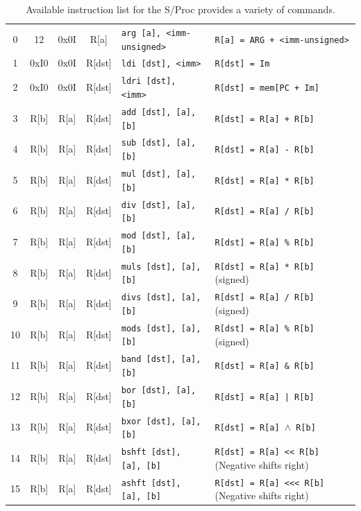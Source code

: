 \documentclass{article}
\begin{document}
\begin{table}[h!]
\begin{footnotesize}
\begin{tabular}{cccc|l|l}
            0 & 12 & 0x0I & R[a] & \texttt{arg [a], <imm-unsigned>} & \texttt{R[a] = ARG + <imm-unsigned>} \\
            1 & 0xI0 & 0x0I & R[dst] & \texttt{ldi [dst], <imm>} & \texttt{R[dst] = Im} \\
            2 & 0xI0 & 0x0I & R[dst] & \texttt{ldri [dst], <imm>} & \texttt{R[dst] = mem[PC + Im]} \\
            3 & R[b] & R[a] & R[dst] & \texttt{add [dst], [a], [b]} & \texttt{R[dst] = R[a] + R[b]} \\
            4 & R[b] & R[a] & R[dst] & \texttt{sub [dst], [a], [b]} & \texttt{R[dst] = R[a] - R[b]} \\
            5 & R[b] & R[a] & R[dst] & \texttt{mul [dst], [a], [b]} & \texttt{R[dst] = R[a] * R[b]} \\
            6 & R[b] & R[a] & R[dst] & \texttt{div [dst], [a], [b]} & \texttt{R[dst] = R[a] / R[b]} \\
            7 & R[b] & R[a] & R[dst] & \texttt{mod [dst], [a], [b]} & \texttt{R[dst] = R[a] \% R[b]} \\
            8 & R[b] & R[a] & R[dst] & \texttt{muls [dst], [a], [b]} & \texttt{R[dst] = R[a] * R[b]} (signed) \\
            9 & R[b] & R[a] & R[dst] & \texttt{divs [dst], [a], [b]} & \texttt{R[dst] = R[a] / R[b]} (signed) \\
            10 & R[b] & R[a] & R[dst] & \texttt{mods [dst], [a], [b]} & \texttt{R[dst] = R[a] \% R[b]} (signed) \\
            11 & R[b] & R[a] & R[dst] & \texttt{band [dst], [a], [b]} & \texttt{R[dst] = R[a] \& R[b]} \\
            12 & R[b] & R[a] & R[dst] & \texttt{bor [dst], [a], [b]} & \texttt{R[dst] = R[a] | R[b]} \\
            13 & R[b] & R[a] & R[dst] & \texttt{bxor [dst], [a], [b]} & \texttt{R[dst] = R[a] $\wedge$ R[b]} \\
            14 & R[b] & R[a] & R[dst] & \texttt{bshft [dst], [a], [b]} & \texttt{R[dst] = R[a] << R[b]} (Negative shifts right) \\
            15 & R[b] & R[a] & R[dst] & \texttt{ashft [dst], [a], [b]} & \texttt{R[dst] = R[a] <<< R[b]} (Negative shifts right) \\
            \hline
        \end{tabular}
    \end{footnotesize}
    \caption{Available instruction list for the S/Proc provides a variety of commands.}
    \label{table:instruction-table}
\end{table}
\end{document}
